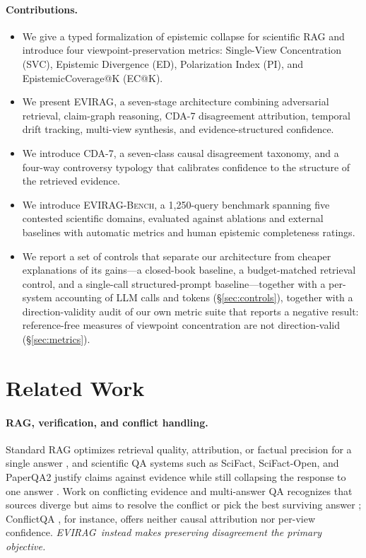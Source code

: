 \documentclass[11pt]{article}
\newcommand{\system}{\textsc{EVIRAG}\xspace}
\newcommand{\bench}{\textsc{EVIRAG-Bench}\xspace}
\begin{document}
\paragraph{Contributions.}
\begin{itemize}[leftmargin=*,nosep]
  \item We give a typed formalization of epistemic collapse for scientific RAG
    and introduce four viewpoint-preservation metrics: Single-View
    Concentration (SVC), Epistemic Divergence (ED), Polarization Index (PI),
    and EpistemicCoverage@K (EC@K).
  \item We present \system, a seven-stage architecture combining adversarial
    retrieval, claim-graph reasoning, CDA-7 disagreement attribution, temporal
    drift tracking, multi-view synthesis, and evidence-structured confidence.
  \item We introduce CDA-7, a seven-class causal disagreement taxonomy, and a
    four-way controversy typology that calibrates confidence to the structure of
    the retrieved evidence.
  \item We introduce \bench, a 1,250-query benchmark spanning five contested
    scientific domains, evaluated against ablations and external baselines with
    automatic metrics and human epistemic completeness ratings.
  \item We report a set of controls that separate our architecture from
    cheaper explanations of its gains---a closed-book baseline, a
    budget-matched retrieval control, and a single-call structured-prompt
    baseline---together with a per-system accounting of LLM calls and tokens
    (\S\ref{sec:controls}), together with a direction-validity audit of our
    own metric suite that reports a negative result: reference-free measures of
    viewpoint concentration are not direction-valid (\S\ref{sec:metrics}).
\end{itemize}

\section{Related Work}
\label{sec:related}

\paragraph{RAG, verification, and conflict handling.}
Standard RAG optimizes retrieval quality, attribution, or factual precision for
a single answer \citep{lewis2020rag,gao2023rarr,min2023factscore,ru2024ragchecker},
and scientific QA systems such as SciFact, SciFact-Open, and PaperQA2 justify
claims against evidence while still collapsing the response to one answer
\citep{wadden2020scifact,wadden2022scifactopen,lala2023paperqa,skarlinski2024paperqa2}.  Work on
conflicting evidence and multi-answer QA recognizes that sources diverge but
aims to resolve the conflict or pick the best surviving answer
\citep{zhong2023romqa,wang2025conflicting,xie2024conflictqa}; ConflictQA
\citep{xie2024conflictqa}, for instance, offers neither causal attribution nor
per-view confidence.  \textit{\textup{\system}\ instead makes preserving
disagreement the primary objective.}
\end{document}
